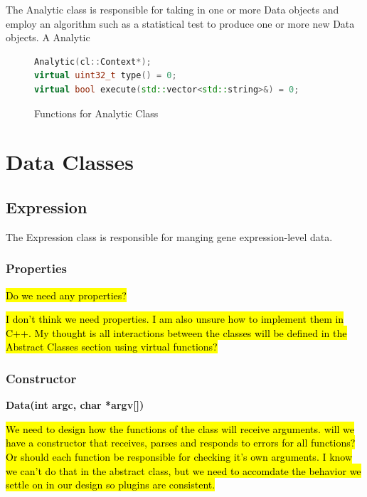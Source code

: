 \documentclass[10pt]{article}
\providecommand{\stephen}[1]{\sethlcolor{lyellow}\hl{#1}}
\providecommand{\josh}[1]{\sethlcolor{lblue}\hl{#1}}
\begin{document}
The Analytic class is responsible for taking in one or more Data objects
and employ an algorithm such as a statistical test to produce one or more 
new Data objects.   A Analytic 

\begin{figure}[H]
\begin{mdframed}[style=functions]
\begin{lstlisting}[language=C++]
Analytic(cl::Context*);
virtual uint32_t type() = 0;
virtual bool execute(std::vector<std::string>&) = 0;
\end{lstlisting}
\end{mdframed}
\caption{Functions for Analytic Class}
\label{fig:kincanalytic}
\end{figure}

\newpage
\section{Data Classes}

\subsection{Expression}

The Expression class is responsible for manging gene expression-level data.  

\subsubsection{Properties}

\stephen{Do we need any properties?}

\josh{I don't think we need properties. I am also unsure how to implement them 
in C++. My thought is all interactions between the classes will be defined in 
the Abstract Classes section using virtual functions?}

\subsubsection{Constructor}

{\bfseries Data(int argc, char *argv[])}

\stephen{We need to design how the functions of the class will receive 
arguments.  will we have a constructor that receives, parses and responds to 
errors for all functions?  Or should each function be responsible for checking 
it's own arguments. I know we can't do that in the abstract class, but 
we need to accomdate the behavior we settle on in our design so plugins
are consistent.}
\end{document}
